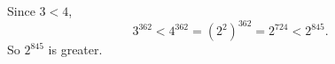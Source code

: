Since $3<4$,
\[
3^{362}<4^{362}=\left(2^2\right)^{362}=2^{724}<2^{845}.
\]
So $\boxed{2^{845}}$ is greater.
